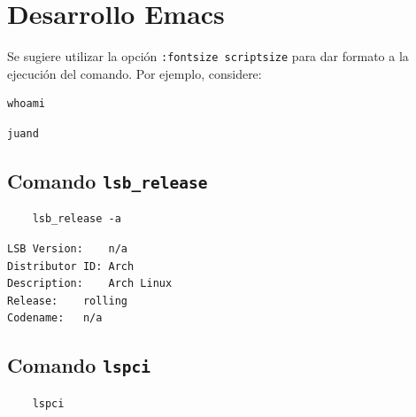 \documentclass{article}
\begin{document}
\section{Desarrollo Emacs}
\label{sec:org21331f9}
Se sugiere utilizar la opción \texttt{:fontsize
scriptsize} para dar formato a la ejecución del comando. Por ejemplo,
considere:

\begin{verbatim}
whoami
\end{verbatim}

\label{org98399c1}
\begin{verbatim}
juand
\end{verbatim}
\subsection{Comando \texttt{lsb\_release}}
\label{sec:orgfe62b15}
\begin{verbatim}
    lsb_release -a
\end{verbatim}

\label{org49d32d1}
\begin{verbatim}
LSB Version:	n/a
Distributor ID:	Arch
Description:	Arch Linux
Release:	rolling
Codename:	n/a
\end{verbatim}
\subsection{Comando \texttt{lspci}}
\label{sec:org2abf461}
\begin{verbatim}
    lspci
\end{verbatim}
\end{document}
